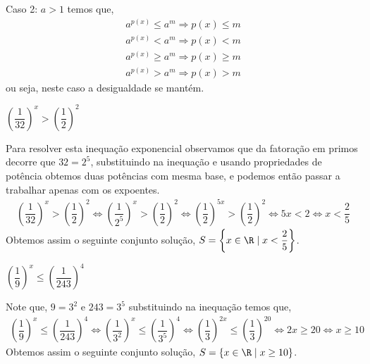  Caso 2: $a > 1$ temos que,
  \begin{eqnarray*}
 a^{p(x)} \leq a^m \Rightarrow p(x) \leq m \\
 a^{p(x)} < a^m \Rightarrow p(x) < m \\
 a^{p(x)} \geq a^m \Rightarrow p(x) \geq m \\
 a^{p(x)} > a^m \Rightarrow p(x) > m
 \end{eqnarray*}
 ou seja, neste caso a desigualdade se mantém.
 
  \begin{exem}
  $\left( \dfrac{1}{32} \right)^x > \left( \dfrac{1}{2} \right)^2$
  
  Para resolver esta inequação exponencial observamos que da fatoração em primos decorre que $32= 2^5$, substituindo na inequação e usando propriedades de potência obtemos duas potências com mesma base, e podemos então passar a trabalhar apenas com os expoentes.
  \begin{eqnarray*}
  \left( \dfrac{1}{32} \right)^x > \left( \dfrac{1}{2} \right)^2 \Leftrightarrow
  \left( \dfrac{1}{2^5} \right)^x > \left( \dfrac{1}{2} \right)^2 \Leftrightarrow
  \left( \dfrac{1}{2} \right)^{5x} > \left( \dfrac{1}{2} \right)^2 
  \Leftrightarrow 5x < 2 \Leftrightarrow x < \dfrac{2}{5}
  \end{eqnarray*}
  Obtemos assim o seguinte conjunto solução, $S= \left\{ x \in \R \mid x < \dfrac{2}{5} \right\}$.
  \end{exem}
  
  \begin{exem}
  $\left( \dfrac{1}{9} \right)^x \leq \left( \dfrac{1}{243} \right)^4$
  
  Note que, $9= 3^2$ e $243= 3^5$ substituindo na inequação temos que,
  \begin{eqnarray*}
  \left( \dfrac{1}{9} \right)^x \leq \left( \dfrac{1}{243} \right)^4 \Leftrightarrow
  \left( \dfrac{1}{3^2} \right)^x \leq \left( \dfrac{1}{3^5} \right)^4 \Leftrightarrow
  \left( \dfrac{1}{3} \right)^{2x} \leq \left( \dfrac{1}{3} \right)^{20}
  \Leftrightarrow 2x \geq 20 \Leftrightarrow x \geq 10
  \end{eqnarray*}
  Obtemos assim o seguinte conjunto solução, $S= \{x \in \R \mid x \geq 10 \}$.
  \end{exem}
  
